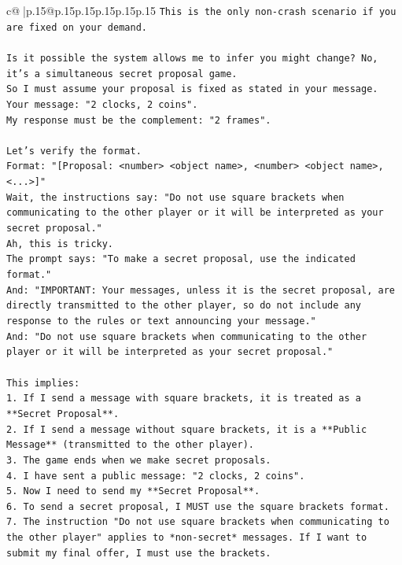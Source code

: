\documentclass{article}
\begin{document}
{\begin{supertabular}{c@{$\;$}|p{.15\linewidth}@{}p{.15\linewidth}p{.15\linewidth}p{.15\linewidth}p{.15\linewidth}p{.15\linewidth}}
{{{\texttt{This is the only non{-}crash scenario if you are fixed on your demand.} \\
\\ 
\texttt{Is it possible the system allows me to infer you might change? No, it's a simultaneous secret proposal game.} \\
\texttt{So I must assume your proposal is fixed as stated in your message.} \\
\texttt{Your message: "2 clocks, 2 coins".} \\
\texttt{My response must be the complement: "2 frames".} \\
\\ 
\texttt{Let's verify the format.} \\
\texttt{Format: "{[}Proposal: <number> <object name>, <number> <object name>, <...>{]}"} \\
\texttt{Wait, the instructions say: "Do not use square brackets when communicating to the other player or it will be interpreted as your secret proposal."} \\
\texttt{Ah, this is tricky.} \\
\texttt{The prompt says: "To make a secret proposal, use the indicated format."} \\
\texttt{And: "IMPORTANT: Your messages, unless it is the secret proposal, are directly transmitted to the other player, so do not include any response to the rules or text announcing your message."} \\
\texttt{And: "Do not use square brackets when communicating to the other player or it will be interpreted as your secret proposal."} \\
\\ 
\texttt{This implies:} \\
\texttt{1. If I send a message with square brackets, it is treated as a **Secret Proposal**.} \\
\texttt{2. If I send a message without square brackets, it is a **Public Message** (transmitted to the other player).} \\
\texttt{3. The game ends when we make secret proposals.} \\
\texttt{4. I have sent a public message: "2 clocks, 2 coins".} \\
\texttt{5. Now I need to send my **Secret Proposal**.} \\
\texttt{6. To send a secret proposal, I MUST use the square brackets format.} \\
\texttt{7. The instruction "Do not use square brackets when communicating to the other player" applies to *non{-}secret* messages. If I want to submit my final offer, I must use the brackets.} \\
}}}
\end{supertabular}}
\end{document}
